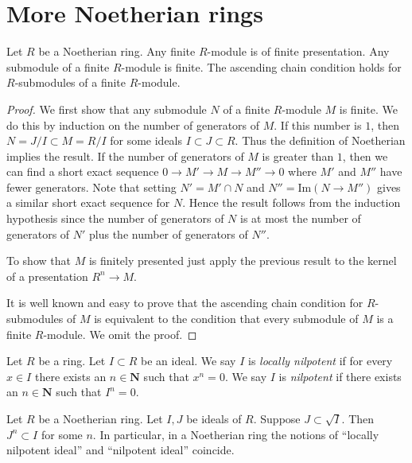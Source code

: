 \section{More Noetherian rings}
\label{section-Noetherian-again}


\begin{lemma}
\label{lemma-Noetherian-basic}
Let $R$ be a Noetherian ring.
Any finite $R$-module is of finite presentation.
Any submodule of a finite $R$-module is finite.
The ascending chain condition holds for $R$-submodules
of a finite $R$-module.
\end{lemma}

\begin{proof}
We first show that any submodule $N$ of a finite $R$-module
$M$ is finite. We do this by induction on the number of
generators of $M$. If this number is $1$, then $N = J/I \subset
M = R/I$ for some ideals $I \subset J \subset R$. Thus the definition
of Noetherian implies the result. If the number of generators of
$M$ is greater than $1$, then we can find a short exact sequence
$0 \to M' \to M \to M'' \to 0$ where $M'$ and $M''$ have fewer
generators. Note that setting $N' = M' \cap N$ and $N'' = \text{Im}(N\to
M'')$ gives a similar short exact sequence for $N$. Hence the result
follows from the induction hypothesis
since the number of generators of $N$ is at most the number of
generators of $N'$ plus the number of generators of $N''$.

\medskip\noindent
To show that $M$ is finitely presented just apply the previous result
to the kernel of a presentation $R^n \to M$.

\medskip\noindent
It is well known and easy to prove that the ascending chain condition for
$R$-submodules of $M$ is equivalent to the condition that every submodule
of $M$ is a finite $R$-module. We omit the proof.
\end{proof}

\begin{definition}
\label{definition-locally-nilpotent-ideal}
Let $R$ be a ring. Let $I \subset R$ be an ideal.
We say $I$ is {\it locally nilpotent} if for every
$x \in I$ there exists an $n \in \mathbf{N}$ such
that $x^n = 0$. We say $I$ is {\it nilpotent} if
there exists an $n \in \mathbf{N}$ such that $I^n = 0$.
\end{definition}

\begin{lemma}
\label{lemma-Noetherian-power}
Let $R$ be a Noetherian ring. Let $I, J$ be ideals of $R$.
Suppose $J \subset \sqrt{I}$. Then $J^n \subset I$ for some $n$.
In particular, in a Noetherian ring the notions of
``locally nilpotent ideal''
and ``nilpotent ideal'' coincide.
\end{lemma}


